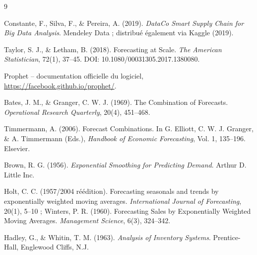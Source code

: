 \documentclass[11pt,a4paper]{article}
\begin{document}
\begin{thebibliography}{9}

Constante, F., Silva, F., \& Pereira, A. (2019). \emph{DataCo Smart Supply Chain for Big Data Analysis}. Mendeley Data ; distribué également via Kaggle (2019).

Taylor, S. J., \& Letham, B. (2018). Forecasting at Scale. \emph{The American Statistician}, 72(1), 37--45. DOI: 10.1080/00031305.2017.1380080.

Prophet -- documentation officielle du logiciel, \url{https://facebook.github.io/prophet/}.

Bates, J. M., \& Granger, C. W. J. (1969). The Combination of Forecasts. \emph{Operational Research Quarterly}, 20(4), 451--468.

Timmermann, A. (2006). Forecast Combinations. In G. Elliott, C. W. J. Granger, \& A. Timmermann (Eds.), \emph{Handbook of Economic Forecasting}, Vol. 1, 135--196. Elsevier.

Brown, R. G. (1956). \emph{Exponential Smoothing for Predicting Demand}. Arthur D. Little Inc.

Holt, C. C. (1957/2004 réédition). Forecasting seasonals and trends by exponentially weighted moving averages. \emph{International Journal of Forecasting}, 20(1), 5--10 ; Winters, P. R. (1960). Forecasting Sales by Exponentially Weighted Moving Averages. \emph{Management Science}, 6(3), 324--342.

Hadley, G., \& Whitin, T. M. (1963). \emph{Analysis of Inventory Systems}. Prentice-Hall, Englewood Cliffs, N.J.

\end{thebibliography}
\end{document}
